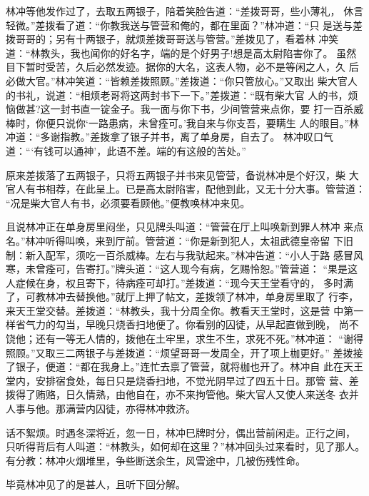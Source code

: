 林冲等他发作过了，去取五两银子，陪着笑脸告道：“差拨哥哥，些小薄礼，
休言轻微。”差拨看了道：“你教我送与管营和俺的，都在里面？”林冲道：“只
是送与差拨哥哥的；另有十两银子，就烦差拨哥哥送与管营。”差拨见了，看着林
冲笑道：“林教头，我也闻你的好名字，端的是个好男子!想是高太尉陷害你了。
虽然目下暂时受苦，久后必然发迹。据你的大名，这表人物，必不是等闲之人，久
后必做大官。”林冲笑道：“皆赖差拨照顾。”差拨道：“你只管放心。”又取出
柴大官人的书礼，说道：“相烦老哥将这两封书下一下。”差拨道：“既有柴大官
人的书，烦恼做甚?这一封书直一锭金子。我一面与你下书，少间管营来点你，要
打一百杀威棒时，你便只说你‘一路患病，未曾痊可。’我自来与你支吾，要瞒生
人的眼目。”林冲道：“多谢指教。”差拨拿了银子并书，离了单身房，自去了。
林冲叹口气道：“‘有钱可以通神’，此语不差。端的有这般的苦处。”

原来差拨落了五两银子，只将五两银子并书来见管营，备说林冲是个好汉，柴
大官人有书相荐，在此呈上。已是高太尉陷害，配他到此，又无十分大事。管营道：
“况是柴大官人有书，必须要看顾他。”便教唤林冲来见。

且说林冲正在单身房里闷坐，只见牌头叫道：“管营在厅上叫唤新到罪人林冲
来点名。”林冲听得叫唤，来到厅前。管营道：“你是新到犯人，太祖武德皇帝留
下旧制：新入配军，须吃一百杀威棒。左右与我驮起来。”林冲告道：“小人于路
感冒风寒，未曾痊可，告寄打。”牌头道：“这人现今有病，乞赐怜恕。”管营道：
“果是这人症候在身，权且寄下，待病痊可却打。”差拨道：“现今天王堂看守的，
多时满了，可教林冲去替换他。”就厅上押了帖文，差拨领了林冲，单身房里取了
行李，来天王堂交替。差拨道：“林教头，我十分周全你。教看天王堂时，这是营
中第一样省气力的勾当，早晚只烧香扫地便了。你看别的囚徒，从早起直做到晚，
尚不饶他；还有一等无人情的，拨他在土牢里，求生不生，求死不死。”林冲道：
“谢得照顾。”又取三二两银子与差拨道：“烦望哥哥一发周全，开了项上枷更好。”
差拨接了银子，便道：“都在我身上。”连忙去禀了管营，就将枷也开了。林冲自
此在天王堂内，安排宿食处，每日只是烧香扫地，不觉光阴早过了四五十日。那管
营、差拨得了贿赂，日久情熟，由他自在，亦不来拘管他。柴大官人又使人来送冬
衣并人事与他。那满营内囚徒，亦得林冲救济。

话不絮烦。时遇冬深将近，忽一日，林冲巳牌时分，偶出营前闲走。正行之间，
只听得背后有人叫道：“林教头，如何却在这里？”林冲回头过来看时，见了那人。
有分教：林冲火烟堆里，争些断送余生，风雪途中，几被伤残性命。

毕竟林冲见了的是甚人，且听下回分解。